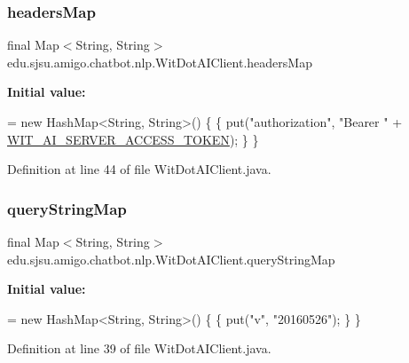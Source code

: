 \subsubsection{\texorpdfstring{headers\+Map}{headersMap}}
{\footnotesize\ttfamily final Map$<$String, String$>$ edu.\+sjsu.\+amigo.\+chatbot.\+nlp.\+Wit\+Dot\+A\+I\+Client.\+headers\+Map\hspace{0.3cm}{\ttfamily [static]}}

{\bfseries Initial value\+:}
\begin{DoxyCode}
= \textcolor{keyword}{new} HashMap<String, String>() \{
        \{
            put(\textcolor{stringliteral}{"authorization"}, \textcolor{stringliteral}{"Bearer "} + \hyperlink{classedu_1_1sjsu_1_1amigo_1_1chatbot_1_1nlp_1_1_wit_dot_a_i_client_abbc6e1b12e9d2831b4fa429fb225f60c}{WIT\_AI\_SERVER\_ACCESS\_TOKEN}); 
        \}
    \}
\end{DoxyCode}


Definition at line 44 of file Wit\+Dot\+A\+I\+Client.\+java.

\mbox{\label{classedu_1_1sjsu_1_1amigo_1_1chatbot_1_1nlp_1_1_wit_dot_a_i_client_af6a6aaec649d55ee99c38bf8208ebf41}} 
\subsubsection{\texorpdfstring{query\+String\+Map}{queryStringMap}}
{\footnotesize\ttfamily final Map$<$String, String$>$ edu.\+sjsu.\+amigo.\+chatbot.\+nlp.\+Wit\+Dot\+A\+I\+Client.\+query\+String\+Map\hspace{0.3cm}{\ttfamily [static]}}

{\bfseries Initial value\+:}
\begin{DoxyCode}
= \textcolor{keyword}{new} HashMap<String, String>() \{
        \{
            put(\textcolor{stringliteral}{"v"}, \textcolor{stringliteral}{"20160526"});
        \}
    \}
\end{DoxyCode}


Definition at line 39 of file Wit\+Dot\+A\+I\+Client.\+java.

